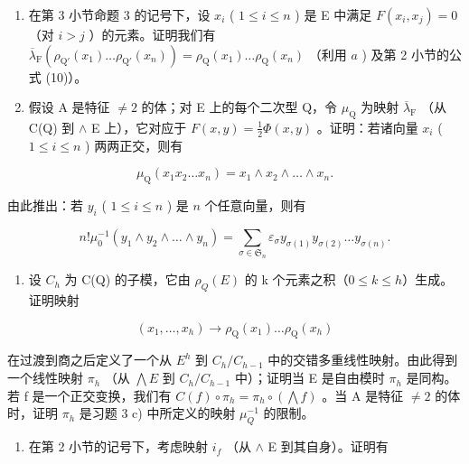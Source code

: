 \begin{enumerate}
\def\labelenumi{\alph{enumi})}
\setcounter{enumi}{1}
\tightlist
\item
  在第 3 小节命题 3 的记号下，设 \(x_i\) ( \(1 \leqslant i \leqslant n\) ) 是 E 中满足 \(F(x_i, x_j) = 0\) （对 \(i > j\) ）的元素。证明我们有 \(\overline{\lambda}_{\mathrm{F}}(\rho_{\mathrm{Q}'}(x_1) \ldots \rho_{\mathrm{Q}'}(x_n)) = \rho_{\mathrm{Q}}(x_1) \ldots \rho_{\mathrm{Q}}(x_n)\) （利用 \(a\) ) 及第 2 小节的公式 (10)）。
\item
  假设 A 是特征 \(\neq 2\) 的体；对 E 上的每个二次型 Q，令 \(\mu_{\mathrm{Q}}\) 为映射 \(\overline{\lambda}_{\mathrm{F}}\) （从 C(Q) 到 \(\wedge\) E 上），它对应于 \(F(x, y) = \frac{1}{2}\Phi(x, y)\) 。证明：若诸向量 \(x_i\) ( \(1 \leqslant i \leqslant n\) ) 两两正交，则有
\end{enumerate}

\[
\mu_ {\mathrm{Q}} (x _ {1} x _ {2} \dots x _ {n}) = x _ {1} \wedge x _ {2} \wedge \dots \wedge x _ {n}.
\]

由此推出：若 \(y_{i}\) ( \(1 \leqslant i \leqslant n\) ) 是 \(n\) 个任意向量，则有

\[
n! \mu_ {0} ^ {- 1} (y _ {1} \wedge y _ {2} \wedge \dots \wedge y _ {n}) = \sum_ {\sigma \in \mathfrak {S} _ {n}} \varepsilon_ {\sigma} y _ {\sigma (1)} y _ {\sigma (2)} \dots y _ {\sigma (n)}.
\]

\begin{enumerate}
\def\labelenumi{\arabic{enumi})}
\setcounter{enumi}{3}
\tightlist
\item
  设 \(C_{h}\) 为 C(Q) 的子模，它由 \(\rho_{Q}(E)\) 的 k 个元素之积（\(0 \leqslant k \leqslant h\)）生成。证明映射
\end{enumerate}

\[
(x _ {1}, \dots , x _ {h}) \rightarrow \rho_ {\mathrm{Q}} (x _ {1}) \dots \rho_ {\mathrm{Q}} (x _ {h})
\]

在过渡到商之后定义了一个从 \(E^{h}\) 到 \(C_{h}/C_{h-1}\) 中的交错多重线性映射。由此得到一个线性映射 \(\pi_{h}\) （从 \(\bigwedge E\) 到 \(C_{h}/C_{h-1}\) 中）；证明当 E 是自由模时 \(\pi_{h}\) 是同构。若 f 是一个正交变换，我们有 \(C(f)\circ\pi_{h}=\pi_{h}\circ(\bigwedge f)\) 。当 A 是特征 \(\neq2\) 的体时，证明 \(\pi_{h}\) 是习题 3 c) 中所定义的映射 \(\mu_{Q}^{-1}\) 的限制。

\begin{enumerate}
\def\labelenumi{\arabic{enumi})}
\setcounter{enumi}{4}
\tightlist
\item
  在第 2 小节的记号下，考虑映射 \(i_{f}\) （从 \(\wedge\) E 到其自身）。证明有
\end{enumerate}

